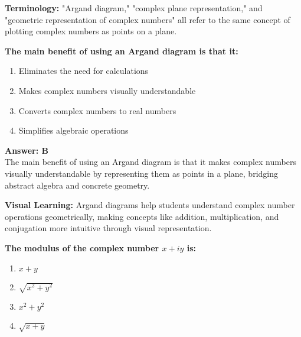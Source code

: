\documentclass[12pt,a4paper]{article}
\begin{document}
\begin{conceptbox}
\textbf{Terminology:} "Argand diagram," "complex plane representation," and "geometric representation of complex numbers" all refer to the same concept of plotting complex numbers as points on a plane.
\end{conceptbox}

\newpage
\begin{questiontitle}[MCQ 87]
\textbf{The main benefit of using an Argand diagram is that it:}
\end{questiontitle}

\begin{partbox}[Options]
\begin{enumerate}[label=\Alph*.]
    \item Eliminates the need for calculations
    \item Makes complex numbers visually understandable
    \item Converts complex numbers to real numbers
    \item Simplifies algebraic operations
\end{enumerate}
\end{partbox}

\begin{answerstyle}
\textbf{Answer: B} \\
The main benefit of using an Argand diagram is that it makes complex numbers visually understandable by representing them as points in a plane, bridging abstract algebra and concrete geometry.
\end{answerstyle}

\begin{conceptbox}
\textbf{Visual Learning:} Argand diagrams help students understand complex number operations geometrically, making concepts like addition, multiplication, and conjugation more intuitive through visual representation.
\end{conceptbox}

\newpage
\begin{questiontitle}[MCQ 88]
\textbf{The modulus of the complex number \( x + iy \) is:}
\end{questiontitle}

\begin{partbox}[Options]
\begin{enumerate}[label=\Alph*.]
    \item \( x + y \)
    \item \( \sqrt{x^2 + y^2} \)
    \item \( x^2 + y^2 \)
    \item \( \sqrt{x + y} \)
\end{enumerate}
\end{partbox}
\end{document}
